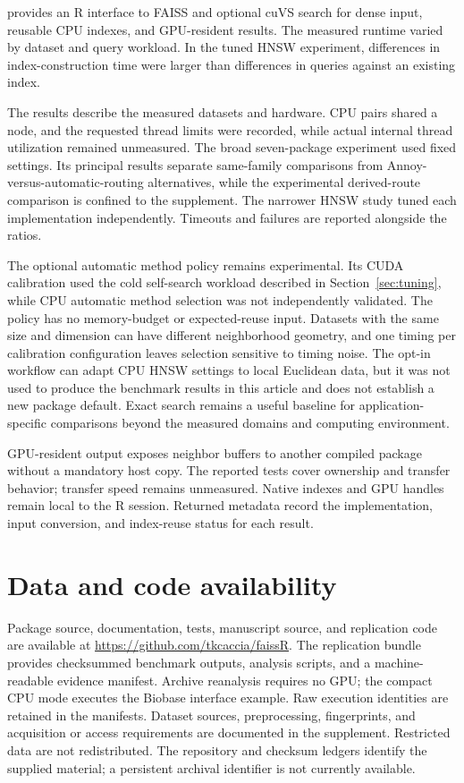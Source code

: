 \documentclass[article]{jss}
\newcommand{\fct}[1]{\code{#1()}}
\begin{document}
 provides an R interface to FAISS and optional cuVS search for
dense input, reusable CPU indexes, and GPU-resident results. The measured
runtime varied by dataset and query workload. In the tuned HNSW experiment,
differences in index-construction time were larger than differences in queries
against an existing index.

The results describe the measured datasets and hardware. CPU pairs shared a
node, and the requested thread limits were recorded, while actual internal
thread utilization remained unmeasured. The broad seven-package experiment
used fixed settings. Its principal results separate same-family comparisons
from Annoy-versus-automatic-routing alternatives, while the experimental
derived-route comparison is confined to the supplement. The narrower HNSW
study tuned each implementation independently. Timeouts and failures are
reported alongside the ratios.

The optional automatic method policy remains experimental. Its CUDA
calibration used the cold self-search workload described in
Section~\ref{sec:tuning}, while CPU automatic method selection was not
independently validated. The policy has no memory-budget or expected-reuse
input. Datasets with the same size and dimension can have different
neighborhood geometry, and one timing per calibration configuration leaves
selection sensitive to timing noise. The opt-in \fct{hnsw\_tune} workflow can
adapt CPU HNSW settings to local Euclidean data, but it was not used to produce
the benchmark results in this article and does not establish a new package
default. Exact search remains a useful baseline for application-specific
comparisons beyond the measured domains and computing environment.

GPU-resident output exposes neighbor buffers to another compiled package
without a mandatory host copy. The reported tests cover ownership and transfer
behavior; transfer speed remains unmeasured. Native indexes and GPU handles
remain local to the R session. Returned metadata record the implementation,
input conversion, and index-reuse status for each result.

\section*{Data and code availability}

Package source, documentation, tests, manuscript source, and replication code
are available at \url{https://github.com/tkcaccia/faissR}. The replication
bundle provides checksummed benchmark outputs, analysis scripts, and a
machine-readable evidence manifest. Archive reanalysis requires no GPU; the
compact CPU mode executes the Biobase interface example. Raw execution
identities are retained in the manifests. Dataset sources, preprocessing,
fingerprints, and acquisition or access requirements are documented in the
supplement. Restricted data are not redistributed. The repository and
checksum ledgers identify the supplied material; a persistent archival
identifier is not currently available.
\end{document}
